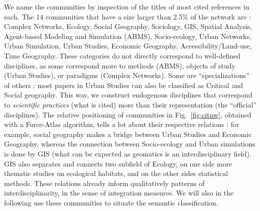 We name the communities by inspection of the titles of most cited references in each. The 14 communities that have a size larger than 2.5\% of the network are : Complex Networks, Ecology, Social Geography, Sociology, GIS, Spatial Analysis, Agent-based Modeling and Simulation (ABMS), Socio-ecology, Urban Networks, Urban Simulation, Urban Studies, Economic Geography, Accessibility/Land-use, Time Geography. These categories do not directly correspond to well-defined disciplines, as some correspond more to methods (ABMS), objects of study (Urban Studies), or paradigms (Complex Networks). Some are ``specializations'' of others : most papers in Urban Studies can also be classified as Critical and Social geography. This way, we construct endogenous disciplines that correspond to \emph{scientific practices} (what is cited) more than their representation (the ``official'' disciplines). The relative positioning of communities in Fig.~\ref{fig:citnw}, obtained with a Force-Atlas algorithm, tells a lot about their respective relations : for example, social geography makes a bridge between Urban Studies and Economic Geography, whereas the connection between Socio-ecology and Urban simulations is done by GIS (what can be expected as geomatics is an interdisciplinary field). GIS also separates and connects two subfield of Ecology, on one side more thematic studies on ecological habitats, and on the other sides statistical methods. These relations already inform qualitatively patterns of interdisciplinarity, in the sense of integration measures. We will also in the following use these communities to situate the semantic classification.









